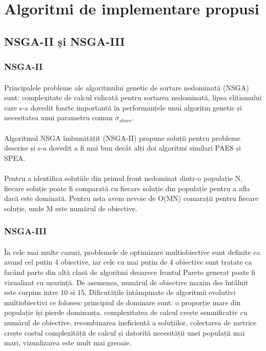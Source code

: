\section{Algoritmi de implementare propusi}
\subsection{NSGA-II și NSGA-III}
\subsubsection{NSGA-II}
\paragraph{}
Principalele probleme ale algoritmului genetic de sortare nedominată (NSGA) sunt: complexitate de calcul ridicată pentru sortarea nedominată, lipsa elitismului care s-a dovedit foarte importantă în performanțele unui algoritm genetic și necesitatea unui parametru comun $\sigma_{share}$. \cite{nsgaii}
\paragraph{}
Algoritmul NSGA îmbunătățit (NSGA-II) propune soluții pentru probleme descrise și s-a dovedit a fi mai bun decât alți doi algoritmi similari PAES și SPEA.
\paragraph{}
Pentru a identifica soluțiile din primul front nedominat dintr-o populație N, fiecare soluție poate fi comparată cu fiecare soluție din populație pentru a afla dacă este dominată. Pentru asta avem nevoie de O(MN) comarații pentru fiecare soluție, unde M este numărul de obiective. \cite{nsgaii}
\subsubsection{NSGA-III}
\paragraph{}
În cele mai multe cazuri, problemele de optimizare multiobiective sunt definite ca avand cel puțin 4 obiective, iar cele cu mai puțin de 4 obiective sunt tratate ca facând parte din altă clasă de algoritmi deoarece frontul Pareto generat poate fi vizualizat cu ușurință. De asemenea, numărul de obiective maxim des întâlnit este curpins intre 10 si 15. Dificutățile întâmpinate de algoritmii evolutivi multiobiectivi ce folosesc principiul de dominare sunt: o proporție mare din populație își pierde dominanța, complexitatea de calcul crește semnificativ cu numărul de obiective, recombinarea ineficientă a soluțiilor, colectarea de metrice crește costul complexității de calcul și datorită necesității unei populații mai mari, vizualizarea este mult mai greoaie. \cite{nsgaiii}
